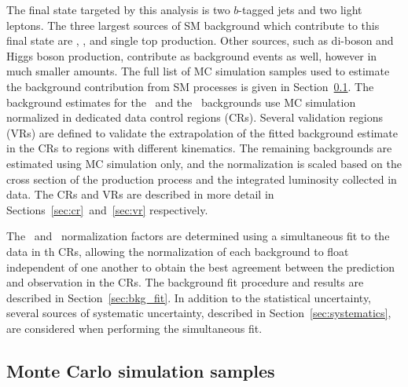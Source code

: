 The final state targeted by this analysis is two $b$-tagged jets and two light
leptons.
The three largest sources of SM background which contribute to this final state
are \TTBAR, \ZGAMMAJETS, and single top production.
Other sources, such as di-boson and Higgs boson production, contribute as
background events as well, however in much smaller amounts.
The full list of MC simulation samples used to estimate the background
contribution from SM processes is given in Section~\ref{sec:mc_samples}.
The background estimates for the \TTBAR\ and the \ZGAMMAJETS\ backgrounds use
MC simulation normalized in dedicated data control regions (CRs).
Several validation regions (VRs) are defined to validate the extrapolation of
the fitted background estimate in the CRs to regions with different kinematics.
The remaining backgrounds are estimated using MC simulation only, and the
normalization is scaled based on the cross section of the production process and
the integrated luminosity collected in data.
The CRs and VRs are described in more detail in
Sections~\ref{sec:cr}~and~\ref{sec:vr} respectively.

The \TTBAR\ and \ZGAMMAJETS\ normalization factors are determined using a
simultaneous fit to the data in th CRs, allowing the normalization of each
background to float independent of one another to obtain the best agreement
between the prediction and observation in the CRs.
The background fit procedure and results are described in
Section~\ref{sec:bkg_fit}.
In addition to the statistical uncertainty, several sources of systematic
uncertainty, described in Section~\ref{sec:systematics}, are considered when
performing the simultaneous fit.

\FloatBarrier
\subsection{Monte Carlo simulation samples}
\label{sec:mc_samples}

